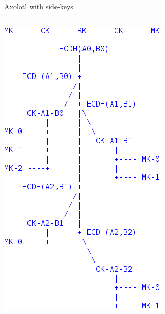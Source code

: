 \documentclass[fleqn,xcolor={usenames,dvipsnames}]{beamer}
\begin{document}
\begin{frame}{Axolotl with side-keys}
\begin{columns}[T]
\includegraphics[width=\textwidth]{../pics/axolotl_diagram}
\end{columns}
\end{frame}
\end{document}
